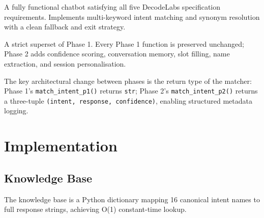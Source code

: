 \documentclass[12pt, a4paper]{article}
\begin{document}
\begin{description}[noitemsep]
  \item[Phase 1 --- The Logic Engine] A fully functional chatbot satisfying all
  five DecodeLabs specification requirements. Implements multi-keyword intent
  matching and synonym resolution with a clean fallback and exit strategy.
  \item[Phase 2 --- The Production Upgrade] A strict superset of Phase 1.
  Every Phase 1 function is preserved unchanged; Phase 2 adds confidence scoring,
  conversation memory, slot filling, name extraction, and session personalisation.
\end{description}

The key architectural change between phases is the return type of the matcher:
Phase 1's \texttt{match\_intent\_p1()} returns \texttt{str}; Phase 2's
\texttt{match\_intent\_p2()} returns a three-tuple
\texttt{(intent, response, confidence)}, enabling structured metadata logging.

\section{Implementation}

\subsection{Knowledge Base}

The knowledge base is a Python dictionary mapping 16 canonical intent names to
full response strings, achieving O(1) constant-time lookup.
\end{document}
